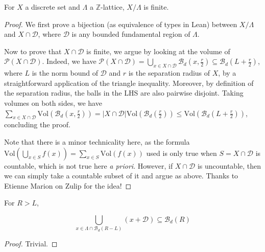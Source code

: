 \begin{lemma}\label{periodic-quot-lattice-finite}\leanok
  For $X$ a discrete set and $\Lambda$ a $\mathbb{Z}$-lattice, $X / \Lambda$ is finite.
\end{lemma}
\begin{proof}\leanok
  We first prove a bijection (as equivalence of types in Lean) between $X / \Lambda$ and $X \cap \mathcal{D}$, where $\mathcal{D}$ is any bounded fundamental region of $\Lambda$.

  Now to prove that $X \cap \mathcal{D}$ is finite, we argue by looking at the volume of $\mathcal{P}(X \cap \mathcal{D})$. Indeed, we have $\mathcal{P}(X \cap \mathcal{D}) = \bigcup_{x \in X \cap \mathcal{D}} \mathcal{B}_d\left(x, \frac{r}{2}\right) \subseteq \mathcal{B}_d\left(L + \frac{r}{2}\right)$, where $L$ is the norm bound of $\mathcal{D}$ and $r$ is the separation radius of $X$, by a straightforward application of the triangle inequality. Moreover, by definition of the separation radius, the balls in the LHS are also pairwise disjoint. Taking volumes on both sides, we have $\sum_{x \in X \cap \mathcal{D}} \mathrm{Vol}\left(\mathcal{B}_d\left(x, \frac{r}{2}\right)\right) = |X \cap \mathcal{D}|\mathrm{Vol}\left(\mathcal{B}_d\left(\frac{r}{2}\right)\right) \leq \mathrm{Vol}\left(\mathcal{B}_d\left(L + \frac{r}{2}\right)\right)$, concluding the proof.

  Note that there is a minor technicality here, as the formula $\mathrm{Vol}\left(\bigcup_{x \in S} f(x)\right) = \sum_{x \in S} \mathrm{Vol}(f(x))$ used is only true when $S = X \cap \mathcal{D}$ is countable, which is not true here \textit{a priori}. However, if $X \cap \mathcal{D}$ is uncountable, then we can simply take a countable subset of it and argue as above. Thanks to Etienne Marion on Zulip for the idea!
\end{proof}

\begin{lemma}\label{some label here}
  For $R > L$, 

  \[
    \bigcup_{x \in \Lambda \cap \mathcal{B}_d(R - L)} (x + \mathcal{D}) \subseteq \mathcal{B}_d(R)
  \]
\end{lemma}
\begin{proof}\uses{}
  Trivial. 
\end{proof}

